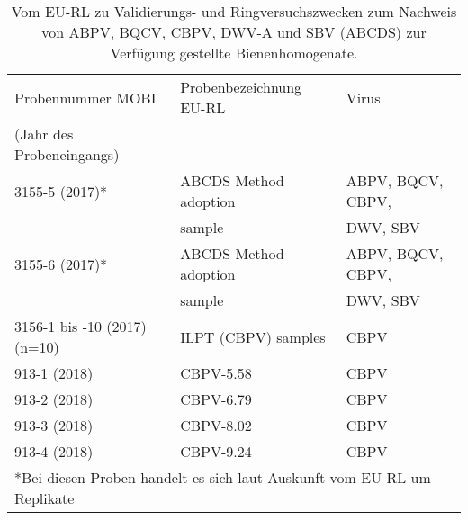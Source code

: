 \begin{table}
    \centering
    \caption{Vom EU-RL zu Validierungs- und Ringversuchszwecken zum Nachweis von ABPV, BQCV, CBPV, DWV-A und SBV (ABCDS) zur Verfügung gestellte Bienenhomogenate.}
    \label{tab:d:homogenate}
    \begin{tabular}{|l|l|l|}
        \hline
        Probennummer MOBI           &   Probenbezeichnung EU-RL     & Virus\\
        (Jahr des Probeneingangs)   &                            & \\
        \hline
        3155-5 (2017)*                  & ABCDS Method adoption         & ABPV, BQCV, CBPV,\\ 
                                        & sample                        & DWV, SBV\\
        3155-6 (2017)*                  & ABCDS Method adoption         & ABPV, BQCV, CBPV,\\ 
                                        & sample                        & DWV, SBV\\
        3156-1 bis -10 (2017) (n=10)    & ILPT (CBPV) samples           & CBPV\\
        913-1 (2018)                    & CBPV-5.58                     & CBPV\\
        913-2 (2018)                    & CBPV-6.79                     & CBPV\\
        913-3 (2018)                    & CBPV-8.02                     & CBPV\\
        913-4 (2018)                    & CBPV-9.24                     & CBPV\\
        \hline
        \multicolumn{3}{l}{*Bei diesen Proben handelt es sich laut Auskunft vom EU-RL um Replikate}
    \end{tabular}
\end{table}